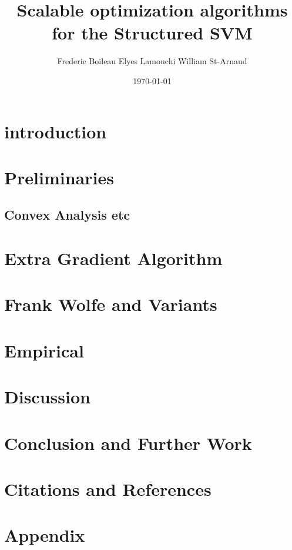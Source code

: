 

\usepackage[
  backend=biber,
  style=numeric,
  citestyle=numeric
  ]{biblatex}
\usepackage[mathcal]{eucal}

\title{Scalable optimization algorithms for the Structured SVM}
\date{\today}
\author{Frederic Boileau Elyes Lamouchi William St-Arnaud}

\maketitle

\clearpage
\section{introduction}



\clearpage
\section{Preliminaries}

\clearpage


\clearpage
\subsection{Convex Analysis etc}


\clearpage
\section{Extra Gradient Algorithm}


\clearpage
\section{Frank Wolfe and Variants}


\clearpage
\section{Empirical}


\clearpage
\section{Discussion}


\clearpage
\section{Conclusion and Further Work}


\clearpage
\section{Citations and References}
\printbibliography

\clearpage
\section{Appendix}


